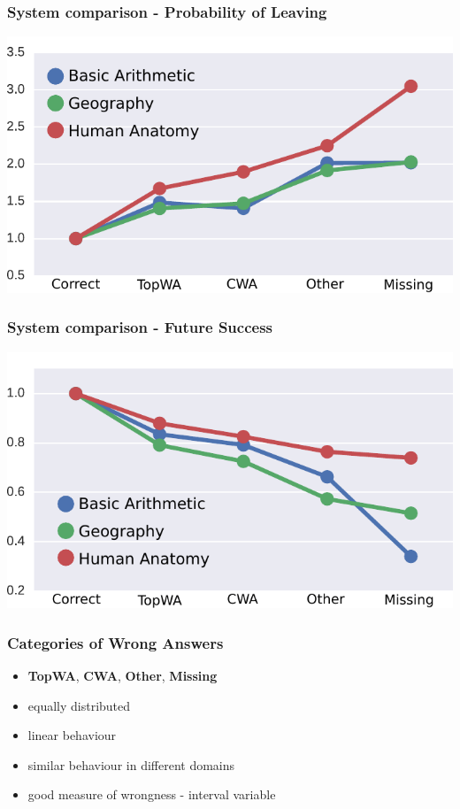 \documentclass[xcolor=svgnames]{beamer}
\begin{document}
\begin{frame}
    \frametitle{System comparison - Probability of Leaving}
    \centering
    \includegraphics[width=0.8\linewidth]{figures/system-comparison-leaving}
\end{frame}
\begin{frame}
    \frametitle{System comparison - Future Success}
    \centering
    \includegraphics[width=0.8\linewidth]{figures/system-comparison-future-success}
\end{frame}
\begin{frame}
    \frametitle{Categories of Wrong Answers}
    \Large
    \begin{itemize}
        \item \textbf{TopWA}, \textbf{CWA}, \textbf{Other}, \textbf{Missing}
        \item equally distributed
        \item linear behaviour
        \item similar behaviour in different domains
        \item good measure of wrongness - interval variable
    \end{itemize}
\end{frame}
\end{document}
